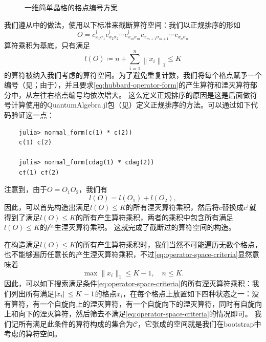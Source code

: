 \documentclass[oneside]{fduthesis}
\begin{document}
\begin{figure}
    \centering
    
    \caption{一维简单晶格的格点编号方案}
    \label{fig:1d-lattice-index}
\end{figure}

我们遵从\parencite{han_manybody}中的做法，使用以下标准来截断算符空间：我们以正规排序的形如
\begin{equation}
    O = c^\dagger_{{x}_1 \sigma_1} c^\dagger_{x_2 \sigma_2} \cdots c^\dagger_{x_m \sigma_m} c_{x_{m+1} \sigma_{m+1}} \cdots c_{x_{n} \sigma_n}
    \label{eq:hubbard-operator-form}
\end{equation}
算符乘积为基底，只有满足
\begin{equation}
    l(O) \coloneqq n + \sum_{i=1}^n \left\| x_{i} \right\|_1 \leq K
    \label{eq:operator-space-criteria}
\end{equation}
的算符被纳入我们考虑的算符空间。为了避免重复计数，我们将每个格点赋予一个编号（见；由于），并且要求\eqref{eq:hubbard-operator-form}的产生算符和湮灭算符部分中，从左往右格点编号均依次增大。
这么定义正规排序的原因是这是后面做符号计算使用的QuantumAlgebra.jl包（见）定义正规排序的方法。可以通过如下代码验证这一点：
\begin{verbatim}
    julia> normal_form(c(1) * c(2))
    c(1) c(2)

    julia> normal_form(cdag(1) * cdag(2))
    c†(1) c†(2)
\end{verbatim}

注意到，由于$O = O_1 O_2$，我们有
\begin{equation}
    l(O) = l(O_1) + l(O_2),
\end{equation}
因此，可以首先构造出满足$l(O) \leq K$的所有湮灭算符乘积，然后将$c$替换成$c^\dagger$就得到了满足$l(O) \leq K$的所有产生算符乘积，两者的乘积中包含所有满足$l(O) \leq K$的产生湮灭算符乘积。
这就完成了截断过的算符空间的构造。

在构造满足$l(O) \leq K$的所有产生算符乘积时，我们当然不可能遍历无数个格点，也不能够遍历任意长的产生湮灭算符乘积，不过\eqref{eq:operator-space-criteria}显然意味着
\begin{equation}
    \max \| x_i \|_1 \leq K - 1, \quad n \leq K.
    \label{eq:inequality-hubbard-opstr}
\end{equation}
因此，可以如下搜索满足条件\eqref{eq:operator-space-criteria}的所有湮灭算符乘积：我们列出所有满足$\abs*{x_i} \leq K - 1$的格点$x_i$，在每个格点上放置如下四种状态之一：没有算符，有一个自旋向上的湮灭算符，有一个自旋向下的湮灭算符，同时有自旋向上和向下的湮灭算符，然后筛去不满足\eqref{eq:operator-space-criteria}的情况即可。
我们记所有满足此条件的算符构成的集合为$\mathcal{C}$，它张成的空间就是我们在bootstrap中考虑的算符空间。
\end{document}

